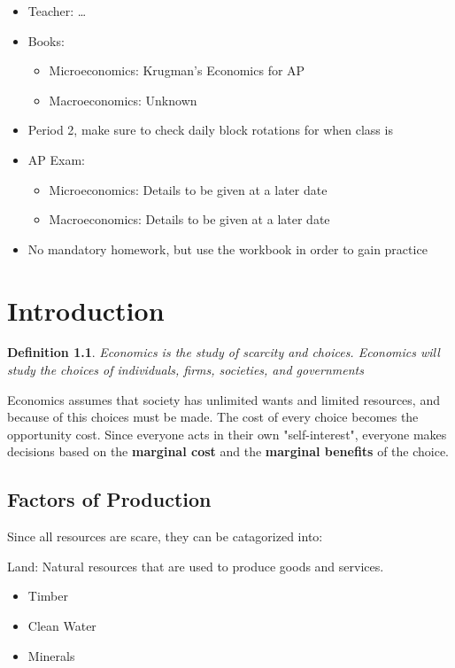 \newtheorem{definition}{Definition}
\begin{itemize}
    \item Teacher: \ldots 
    \item Books:
        \begin{itemize}
            \item Microeconomics: Krugman's Economics for AP
            \item Macroeconomics: Unknown
        \end{itemize}
    \item Period 2, make sure to check daily block rotations for when class is
    \item AP Exam:
        \begin{itemize}
            \item Microeconomics: Details to be given at a later date
            \item Macroeconomics: Details to be given at a later date
        \end{itemize}
    \item No mandatory homework, but use the workbook in order to gain practice
\end{itemize}
\newpage

\chapter{\normalfont Introduction}
\begin{definition}
    Economics is the study of scarcity and choices. Economics will study the choices of individuals, firms, societies, and governments
\end{definition}
Economics assumes that society has unlimited wants and limited resources, and because of this choices must be made. The cost of every choice becomes the opportunity cost. Since everyone acts in their own "self-interest", everyone makes decisions based on the \textbf{marginal cost} and the \textbf{marginal benefits} of the choice. 
\section{ Factors of Production}
Since all resources are scare, they can be catagorized into: 

Land: Natural resources that are used to produce goods and services.
\begin{itemize}
    \item Timber
    \item Clean Water
    \item Minerals
\end{itemize}

